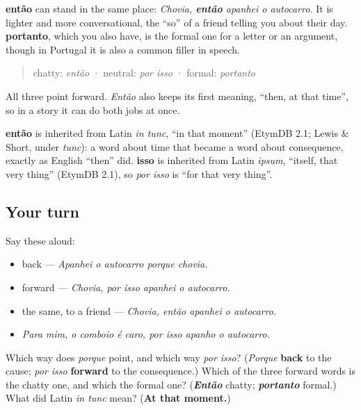 \begin{grammarlens}[title={Grammar Lens: então and portanto}]
\textbf{então} can stand in the same place: \emph{Chovia, \textbf{então} apanhei o autocarro.} It is lighter and more conversational, the \textquotedblleft{}so\textquotedblright{} of a friend telling you about their day. \textbf{portanto}, which you also have, is the formal one for a letter or an argument, though in Portugal it is also a common filler in speech.

\begin{quote}
chatty: \emph{então} · neutral: \emph{por isso} · formal: \emph{portanto}
\end{quote}

All three point forward. \emph{Então} also keeps its first meaning, \textquotedblleft{}then, at that time\textquotedblright{}, so in a story it can do both jobs at once.
\end{grammarlens}

\begin{cousinweb}
\textbf{então} is inherited from Latin \emph{in tunc}, \textquotedblleft{}in that moment\textquotedblright{} (EtymDB 2.1; Lewis \& Short, under \emph{tunc}): a word about time that became a word about consequence, exactly as English \textquotedblleft{}then\textquotedblright{} did. \textbf{isso} is inherited from Latin \emph{ipsum}, \textquotedblleft{}itself, that very thing\textquotedblright{} (EtymDB 2.1), so \emph{por isso} is \textquotedblleft{}for that very thing\textquotedblright{}.
\end{cousinweb}

\subsection*{Your turn}
Say these aloud:

\begin{itemize}
\raggedright
  \item back — \emph{Apanhei o autocarro porque chovia.}
  \item forward — \emph{Chovia, por isso apanhei o autocarro.}
  \item the same, to a friend — \emph{Chovia, então apanhei o autocarro.}
  \item \emph{Para mim, o comboio é caro, por isso apanho o autocarro.}
\end{itemize}

\begin{tcolorbox}[breakable,colback=teal!4,colframe=teal!35!black,title={Before you move on}]
Which way does \emph{porque} point, and which way \emph{por isso}? (\emph{Porque} \textbf{back} to the cause; \emph{por isso} \textbf{forward} to the consequence.) Which of the three forward words is the chatty one, and which the formal one? (\emph{\textbf{Então}} chatty; \emph{\textbf{portanto}} formal.) What did Latin \emph{in tunc} mean? (\textbf{At that moment.})
\end{tcolorbox}
